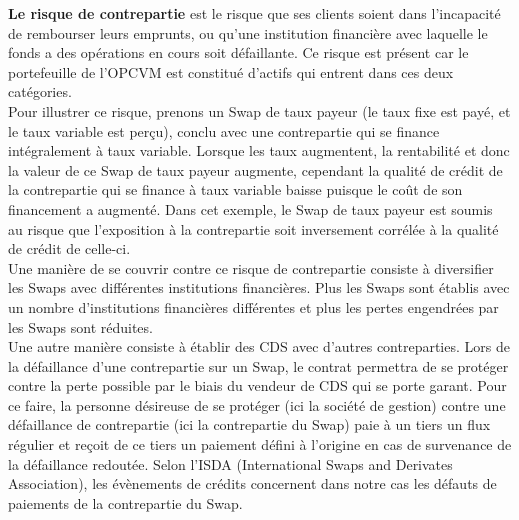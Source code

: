 \documentclass[french,12pt,a4paper]{article}
\begin{document}
\indent \textbf{Le risque de contrepartie} est le risque que ses clients soient dans l'incapacité de rembourser leurs emprunts, ou qu'une institution financière avec laquelle le fonds a des opérations en cours soit défaillante. Ce risque est présent car le portefeuille de l'OPCVM est constitué d'actifs qui entrent dans ces deux catégories.\\
\indent Pour illustrer ce risque, prenons un Swap de taux payeur (le taux fixe est payé, et le taux variable est perçu), conclu avec une contrepartie qui se finance intégralement à taux variable. Lorsque les taux augmentent, la rentabilité et donc la valeur de ce Swap de taux payeur augmente, cependant la qualité de crédit de la contrepartie qui se finance à taux variable baisse puisque le coût de son financement a augmenté. Dans cet exemple, le Swap de taux payeur est soumis au risque que l'exposition à la contrepartie soit inversement corrélée à la qualité de crédit de celle-ci. \\
\indent Une manière de se couvrir contre ce risque de contrepartie consiste à diversifier les Swaps avec différentes institutions financières. Plus les Swaps sont établis avec un nombre d'institutions financières différentes et plus les pertes engendrées par les Swaps sont réduites.\\
Une autre manière consiste à établir des CDS avec d'autres contreparties. Lors de la défaillance d'une contrepartie sur un Swap, le contrat permettra de se protéger contre la perte possible par le biais du vendeur de CDS qui se porte garant. Pour ce faire, la personne désireuse de se protéger (ici la société de gestion) contre une défaillance de contrepartie (ici la contrepartie du Swap) paie à un tiers un flux régulier et reçoit de ce tiers un paiement défini à l'origine en cas de survenance de la défaillance redoutée. Selon l'ISDA (International Swaps and Derivates Association), les évènements de crédits concernent dans notre cas les défauts de paiements de la contrepartie du Swap.\\
\end{document}
